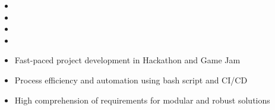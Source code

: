 
\begin{itemize}
\item[\faCommentsO] 
\item[\faCommentsO] 
\item[\faCommentsO] 
\item[\faCommentsO] \par
\end{itemize}

\bigskip
\medskip



\begin{itemize}
	\item[\faAngleRight] Fast-paced project development in Hackathon and Game Jam
	\item[\faAngleRight] Process efficiency and automation using bash script and CI/CD
	\item[\faAngleRight] High comprehension of requirements for modular and robust solutions \par
\end{itemize}

\smallskip
\divider

\hfill
{}\hfill
{}\par
\smallskip
{}\hfill
{}\hfill
{}\hfill
{}\par
